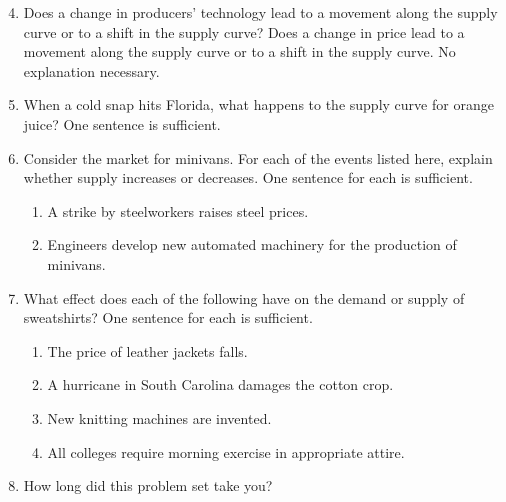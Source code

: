 \documentclass{article}
\begin{document}
\begin{enumerate}
\setcounter{enumi}{3}

\item Does a change in producers' technology lead to a movement along the supply curve or to a shift in the supply curve? Does a change in price lead to a movement along the supply curve or to a shift in the supply curve. No explanation necessary.

\item When a cold snap hits Florida, what happens to the supply curve for orange juice? One sentence is sufficient.

\item Consider the market for minivans. For each of the events listed here, explain whether supply increases or decreases. One sentence for each is sufficient.

	\begin{enumerate}
	
	\item A strike by steelworkers raises steel prices.
	
	\item Engineers develop new automated machinery for the production of minivans.
	
	\end{enumerate}
	
\item What effect does each of the following have on the demand or supply of sweatshirts? One sentence for each is sufficient. 

	\begin{enumerate}
	
	\item The price of leather jackets falls.
	
	\item A hurricane in South Carolina damages the cotton crop.
	
	\item New knitting machines are invented. 
	
	\item All colleges require morning exercise in appropriate attire.
	
	\end{enumerate}
	
\item How long did this problem set take you?

\end{enumerate}
\end{document}
